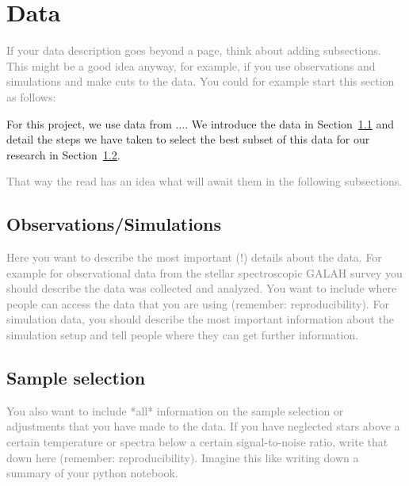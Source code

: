 \documentclass[
  journal=pasa,
  manuscript=Research-Article,
  year=2025,
  volume=X,
]{cup-journal}
\newcommand{\comment}[1]{\textcolor{gray}{#1}}
\begin{document}
\clearpage
\section{Data} \label{sec:data}

\comment{If your data description goes beyond a page, think about adding subsections. This might be a good idea anyway, for example, if you use observations and simulations and make cuts to the data. You could for example start this section as follows:}

For this project, we use data from .... We introduce the data in Section~\ref{sec:data_observations} and detail the steps we have taken to select the best subset of this data for our research in Section~\ref{sec:data_selection}.

\comment{That way the read has an idea what will await them in the following subsections.}

\subsection{Observations/Simulations} \label{sec:data_observations}

\comment{Here you want to describe the most important (!) details about the data. For example for observational data from the stellar spectroscopic GALAH survey \citep{Buder2018, Buder2021, Buder2024b} you should describe the data was collected and analyzed. You want to include where people can access the data that you are using (remember: reproducibility). For simulation data, you should describe the most important information about the simulation setup and tell people where they can get further information.}

\subsection{Sample selection} \label{sec:data_selection}

\comment{You also want to include *all* information on the sample selection or adjustments that you have made to the data. If you have neglected stars above a certain temperature or spectra below a certain signal-to-noise ratio, write that down here (remember: reproducibility). Imagine this like writing down a summary of your python notebook.}

\clearpage
\end{document}
